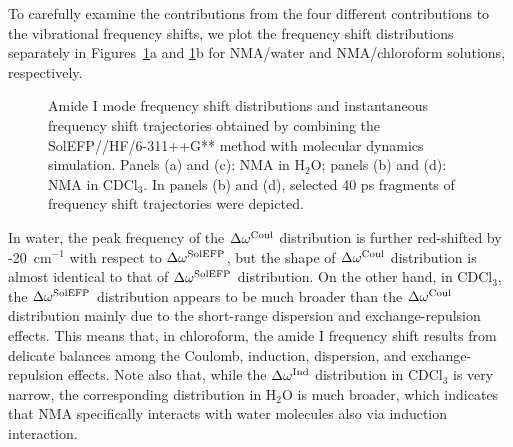 \documentclass[a4paper,titlepage,twoside,fleqn,12pt]{book}
\begin{document}
\begin{refsection}
To carefully examine the contributions from the four
different contributions to the vibrational frequency shifts, 
we plot the frequency shift distributions
separately in Figures~\ref{f:nma-solefp-md-distr}a and 
\ref{f:nma-solefp-md-distr}b for NMA/water and
NMA/chloroform solutions, respectively. 
%
\begin{figure}[t!]
\centering
\setlength\fboxsep{0.4pt}
\setlength\fboxrule{0.5pt}
\caption{
Amide I mode frequency shift distributions and instantaneous 
frequency shift trajectories obtained by combining 
the SolEFP//HF/6-311++G** method with molecular dynamics 
simulation. Panels (a) and (c): NMA in H$_2$O; panels (b) and (d): 
NMA in CDCl$_3$. In panels (b) and (d), selected 40 ps fragments 
of frequency shift trajectories were depicted.
\label{f:nma-solefp-md-distr}}
\end{figure}
%
In water, the peak
frequency of the $\Delta\omega^{\rm Coul}$ distribution is further red\hyp{}shifted by
-20~cm$^{-1}$ with respect to $\Delta\omega^{\rm SolEFP}$, but the shape of $\Delta\omega^{\rm Coul}$
distribution is almost identical to that of $\Delta\omega^{\rm SolEFP}$ distribution.
On the other hand, in CDCl$_3$, the $\Delta\omega^{\rm SolEFP}$ distribution appears
to be much broader than the $\Delta\omega^{\rm Coul}$ distribution mainly due
to the short\hyp{}range dispersion and exchange\hyp{}repulsion effects.
This means that, in chloroform, the amide I frequency shift
results from delicate balances among the Coulomb, induction,
dispersion, and exchange\hyp{}repulsion effects. Note also that,
while the $\Delta\omega^{\rm Ind}$ distribution in CDCl$_3$ is very narrow, the
corresponding distribution in H$_2$O is much broader, which
indicates that NMA specifically interacts with water molecules
also via induction interaction.




\end{refsection}
\end{document}
